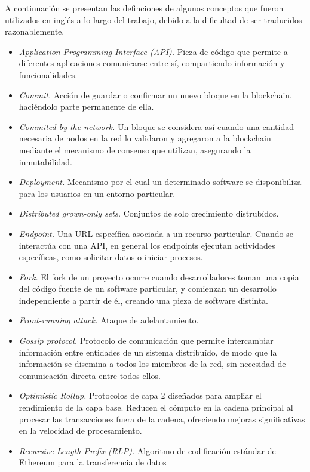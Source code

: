 A continuación se presentan las definciones de algunos conceptos que fueron utilizados
en inglés a lo largo del trabajo, debido a la dificultad de ser traducidos razonablemente.
\begin{itemize}
     \item \textit{Application Programming Interface (API).}  Pieza de código que permite a diferentes
     aplicaciones comunicarse entre sí, compartiendo información y funcionalidades.
     \item \textit{Commit.} Acción de guardar o confirmar un nuevo bloque en la
     blockchain, haciéndolo parte permanente de ella.
     \item \textit{Commited by the network.} Un bloque se considera así cuando una cantidad necesaria de nodos
     en la red lo validaron y agregaron a la blockchain mediante el mecanismo de consenso que utilizan,
     asegurando la inmutabilidad. 
     \item \textit{Deployment.} Mecanismo por el cual un determinado software se disponibiliza para los usuarios
     en un entorno particular.
     \item \textit{Distributed grown-only sets.} Conjuntos de solo crecimiento distrubídos.
     \item \textit{Endpoint.} Una URL específica asociada a un recurso particular. Cuando se interactúa con una API,
     en general los endpoints ejecutan actividades específicas, como solicitar datos o iniciar procesos.
     \item \textit{Fork.} El fork de un proyecto ocurre cuando desarrolladores toman una copia del código fuente de
     un software particular, y comienzan un desarrollo independiente a partir de él, creando una pieza de software
     distinta.
     \item \textit{Front-running attack.} Ataque de adelantamiento.
     \item \textit{Gossip protocol.} Protocolo de comunicación que permite intercambiar información
     entre entidades de un sistema distribuído, de modo que la información se disemina a todos los miembros de la red,
     sin necesidad de comunicación directa entre todos ellos.
     \item \textit{Optimistic Rollup.} Protocolos de capa 2 diseñados para ampliar el rendimiento de la capa base.
     Reducen el cómputo en la cadena principal al procesar las transacciones fuera de la cadena, ofreciendo mejoras
     significativas en la velocidad de procesamiento.
     \item \textit{Recursive Length Prefix (RLP).} Algoritmo de codificación estándar de Ethereum para la transferencia de datos

\end{itemize}
